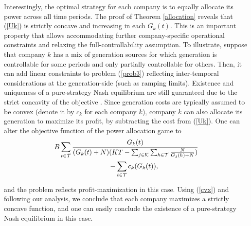 Interestingly, the optimal strategy for each company is to equally allocate its power across all time periods. The proof of Theorem \ref{allocation} reveals that (\ref{Uk}) is strictly concave and increasing in each $G_k(t)$. This is an important property that allows accommodating further company-specific operational constraints and relaxing the full-controllability assumption. To illustrate, suppose that company $k$ has a mix of generation sources for which generation is controllable for some periods and only partially controllable for others. Then, it can add linear constraints to problem (\ref{prob3}) reflecting inter-temporal considerations at the generation-side (such as ramping limits). Existence and uniqueness of a pure-strategy Nash equilibrium are still guaranteed due to the strict concavity of the objective \cite{basar}. Since generation costs are typically assumed to be convex \cite{bosebook} (denote it by $c_k$ for each company $k$), company $k$ can also allocate its generation to maximize its profit, by subtracting the cost from (\ref{Uk}). One can alter the objective function of the power allocation game to 
   \begin{align}&B\sum_{t\in {\cal T}}\frac{G_k(t)}{(G_k(t)+N)(KT-\sum_{j\in {\cal K}}\sum_{h\in {\cal T}}\frac{N}{G_j(h)+N})}\nonumber \\
   & \qquad\qquad\qquad \qquad-\sum_{t\in {\cal T}} c_k(G_k(t)),\label{cvx}\end{align}
   
 \noindent and the problem reflects profit-maximization in this case. Using (\ref{cvx}) and following our analysis, {\color{blue} we conclude that each company maximizes a strictly concave function}, and one can easily conclude the existence of a pure-strategy Nash equilibrium in this case. 
